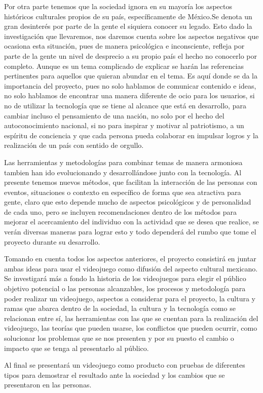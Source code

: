 Por otra parte tenemos que la sociedad ignora en su mayoría los aspectos históricos culturales propios de su país, específicamente de México.Se denota un gran desinterés por parte de la gente el siquiera conocer su legado. Esto dado la investigación que llevaremos, nos daremos cuenta sobre los aspectos negativos que ocasiona esta situación, pues de manera psicológica e inconsciente, refleja por parte de la gente un nivel de desprecio a su propio país el hecho no conocerlo por completo. Aunque es un tema complicado de explicar se harán las referencias pertinentes para aquellos que quieran abundar en el tema. Es aquí donde se da la importancia del proyecto, pues no solo hablamos de comunicar contenido e ideas, no solo hablamos de encontrar una manera diferente de ocio para los usuarios, si no de utilizar la tecnología que se tiene al alcance que está en desarrollo, para cambiar incluso el pensamiento de una nación, no solo por el hecho del autoconocimiento nacional, si no para inspirar y motivar al patriotismo, a un espíritu de conciencia y que cada persona pueda colaborar en impulsar logros y la realización de un país con sentido de orgullo.

Las herramientas y metodologías para combinar temas de manera armoniosa tambien han ido evolucionando y desarrollándose junto con la tecnología. Al presente tenemos nuevos métodos, que facilitan la interacción de las personas con eventos, situaciones o contexto en específico de forma que sea atractiva para gente, claro que esto depende mucho de aspectos psicológicos y de personalidad de cada uno, pero se incluyen recomendaciones dentro de los métodos para mejorar el acercamiento del individuo con la actividad que se desea que realice, se verán diversas maneras para lograr esto y todo dependerá del rumbo que tome el proyecto durante su desarrollo.

Tomando en cuenta todos los aspectos anteriores, el proyecto consistirá en juntar ambas ideas para usar el videojuego como difusión del aspecto cultural mexicano. Se investigará más a fondo la historia de los videojuegos para elegir el público objetivo potencial o las personas alcanzables, los procesos y metodología para poder realizar un videojuego, aspectos a considerar para el proyecto, la cultura y ramas que abarca dentro de la sociedad, la cultura y la tecnología como se relacionan entre sí, las herramientas con las que se cuentan para la realización del videojuego, las teorías que pueden usarse, los conflictos que pueden ocurrir, como solucionar los problemas que se nos presenten y por su puesto el cambio o impacto que se tenga al presentarlo al público.

Al final se presentará un videojuego como producto con pruebas de diferentes tipos para demostrar el resultado ante la sociedad y los cambios que se presentaron en las personas.